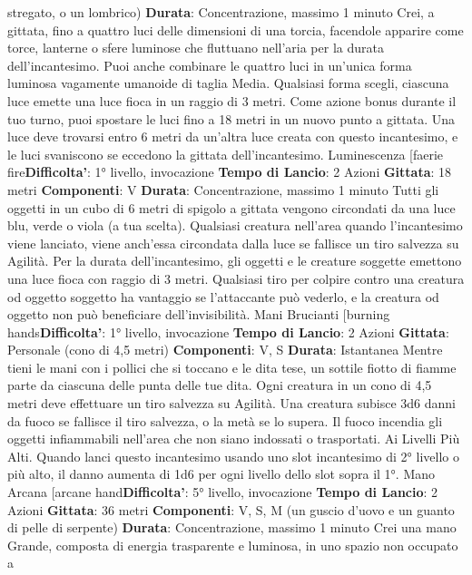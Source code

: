 \begin{multicols}{2}
stregato, o un lombrico)
\textbf{Durata}: Concentrazione, massimo 1 minuto
Crei, a gittata, fino a quattro luci delle dimensioni di una
torcia, facendole apparire come torce, lanterne o sfere
luminose che fluttuano nell’aria per la durata
dell’incantesimo. Puoi anche combinare le quattro luci
in un’unica forma luminosa vagamente umanoide di
taglia Media. Qualsiasi forma scegli, ciascuna luce
emette una luce fioca in un raggio di 3 metri.
Come azione bonus durante il tuo turno, puoi spostare
le luci fino a 18 metri in un nuovo punto a gittata. Una
luce deve trovarsi entro 6 metri da un’altra luce creata
con questo incantesimo, e le luci svaniscono se
eccedono la gittata dell’incantesimo.
Luminescenza
[faerie fire\textbf{Difficolta'}:
1° livello, invocazione
\textbf{Tempo di Lancio}: 2 Azioni
\textbf{Gittata}: 18 metri
\textbf{Componenti}: V
\textbf{Durata}: Concentrazione, massimo 1 minuto
Tutti gli oggetti in un cubo di 6 metri di spigolo a gittata
vengono circondati da una luce blu, verde o viola (a tua
scelta). Qualsiasi creatura nell’area quando
l’incantesimo viene lanciato, viene anch’essa circondata
dalla luce se fallisce un tiro salvezza su Agilità. Per
la durata dell’incantesimo, gli oggetti e le creature
soggette emettono una luce fioca con raggio di 3 metri.
Qualsiasi tiro per colpire contro una creatura od oggetto
soggetto ha vantaggio se l’attaccante può vederlo, e la
creatura od oggetto non può beneficiare dell’invisibilità.
Mani Brucianti
[burning hands\textbf{Difficolta'}:
1° livello, invocazione
\textbf{Tempo di Lancio}: 2 Azioni
\textbf{Gittata}: Personale (cono di 4,5 metri)
\textbf{Componenti}: V, S
\textbf{Durata}: Istantanea
Mentre tieni le mani con i pollici che si toccano e le dita
tese, un sottile fiotto di fiamme parte da ciascuna delle
punta delle tue dita. Ogni creatura in un cono di 4,5
metri deve effettuare un tiro salvezza su Agilità.
Una creatura subisce 3d6 danni da fuoco se fallisce il
tiro salvezza, o la metà se lo supera.
Il fuoco incendia gli oggetti infiammabili nell’area che
non siano indossati o trasportati.
Ai Livelli Più Alti. Quando lanci questo incantesimo
usando uno slot incantesimo di 2° livello o più alto, il
danno aumenta di 1d6 per ogni livello dello slot sopra il
1°.
Mano Arcana
[arcane hand\textbf{Difficolta'}:
5° livello, invocazione
\textbf{Tempo di Lancio}: 2 Azioni
\textbf{Gittata}: 36 metri
\textbf{Componenti}: V, S, M (un guscio d’uovo e un guanto di
pelle di serpente)
\textbf{Durata}: Concentrazione, massimo 1 minuto
Crei una mano Grande, composta di energia
trasparente e luminosa, in uno spazio non occupato a

\end{multicols}
